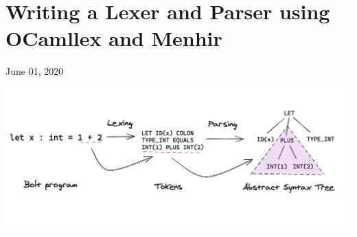 %
%
%
%
%
%

\hypertarget{top-of-page}{%
\chapter{Writing a Lexer and Parser using OCamllex and
Menhir}\label{top-of-page}}

June 01, 2020

%

\includegraphics[width=\linewidth]{03_files/parsing-overview.png}

